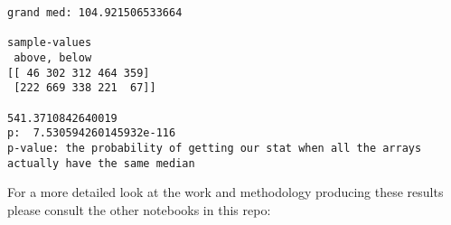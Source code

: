 \documentclass[11pt]{article}
\begin{document}
    \begin{Verbatim}[commandchars=\\\{\}]
grand med: 104.921506533664

sample-values
 above, below
[[ 46 302 312 464 359]
 [222 669 338 221  67]]

541.3710842640019
p:  7.530594260145932e-116
p-value: the probability of getting our stat when all the arrays actually have the same median

    \end{Verbatim}

    For a more detailed look at the work and methodology producing these
results please consult the other notebooks in this repo:


    
    
    
    
\end{document}
